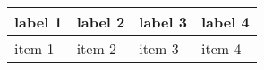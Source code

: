\documentclass{article}
\begin{document}
%
\begin{tabularx}{\textwidth}{ |l|R|l|R| }
  \hline
  label 1 & label 2 & label 3 & label 4 \\
  \hline 
  item 1  & item 2  & item 3  & item 4  \\
  \hline
\end{tabularx}
\end{document}

